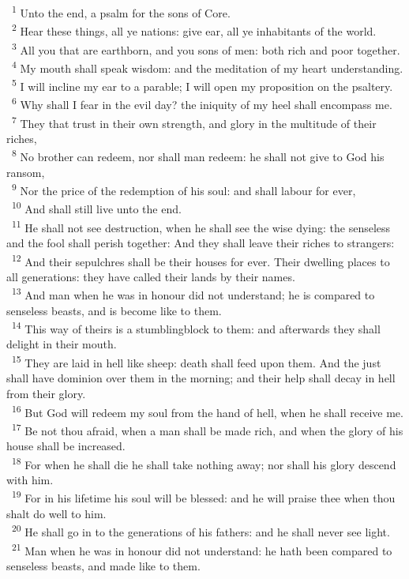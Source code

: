 \documentclass[a5paper,12pt]{article}
\begin{document}
\begin{multicols*}{2}
~\textsuperscript{1} Unto the end, a psalm for the sons of Core.\\
~\textsuperscript{2} Hear these things, all ye nations: give ear, all ye inhabitants of the world.\\
~\textsuperscript{3} All you that are earthborn, and you sons of men: both rich and poor together.\\
~\textsuperscript{4} My mouth shall speak wisdom: and the meditation of my heart understanding.\\
~\textsuperscript{5} I will incline my ear to a parable; I will open my proposition on the psaltery.\\
~\textsuperscript{6} Why shall I fear in the evil day? the iniquity of my heel shall encompass me.\\
~\textsuperscript{7} They that trust in their own strength, and glory in the multitude of their riches,\\
~\textsuperscript{8} No brother can redeem, nor shall man redeem: he shall not give to God his ransom,\\
~\textsuperscript{9} Nor the price of the redemption of his soul: and shall labour for ever,\\
~\textsuperscript{10} And shall still live unto the end.\\
~\textsuperscript{11} He shall not see destruction, when he shall see the wise dying: the senseless and the fool shall perish together: And they shall leave their riches to strangers:\\
~\textsuperscript{12} And their sepulchres shall be their houses for ever. Their dwelling places to all generations: they have called their lands by their names.\\
~\textsuperscript{13} And man when he was in honour did not understand; he is compared to senseless beasts, and is become like to them.\\
~\textsuperscript{14} This way of theirs is a stumblingblock to them: and afterwards they shall delight in their mouth.\\
~\textsuperscript{15} They are laid in hell like sheep: death shall feed upon them. And the just shall have dominion over them in the morning; and their help shall decay in hell from their glory.\\
~\textsuperscript{16} But God will redeem my soul from the hand of hell, when he shall receive me.\\
~\textsuperscript{17} Be not thou afraid, when a man shall be made rich, and when the glory of his house shall be increased.\\
~\textsuperscript{18} For when he shall die he shall take nothing away; nor shall his glory descend with him.\\
~\textsuperscript{19} For in his lifetime his soul will be blessed: and he will praise thee when thou shalt do well to him.\\
~\textsuperscript{20} He shall go in to the generations of his fathers: and he shall never see light.\\
~\textsuperscript{21} Man when he was in honour did not understand: he hath been compared to senseless beasts, and made like to them.\\


\end{multicols*}
\end{document}
